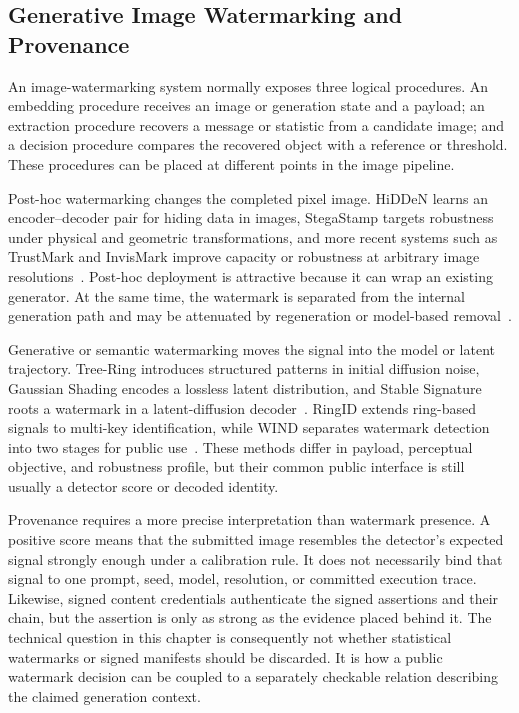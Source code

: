 \subsection{Generative Image Watermarking and Provenance}
\label{subsec:ch4-watermark-background}

An image-watermarking system normally exposes three logical procedures.  An
embedding procedure receives an image or generation state and a payload; an
extraction procedure recovers a message or statistic from a candidate image; and a
decision procedure compares the recovered object with a reference or threshold.
These procedures can be placed at different points in the image pipeline.

Post-hoc watermarking changes the completed pixel image.  HiDDeN learns an
encoder--decoder pair for hiding data in images, StegaStamp targets robustness
under physical and geometric transformations, and more recent systems such as
TrustMark and InvisMark improve capacity or robustness at arbitrary image
resolutions~\cite{zhu2018hidden,tancik2020stegastamp,bui2025trustmark,
xu2025invismark}.  Post-hoc deployment is attractive because it can wrap an
existing generator.  At the same time, the watermark is separated from the
internal generation path and may be attenuated by regeneration or model-based
removal~\cite{zhao2024removable}.

Generative or semantic watermarking moves the signal into the model or latent
trajectory.  Tree-Ring introduces structured patterns in initial diffusion noise,
Gaussian Shading encodes a lossless latent distribution, and Stable Signature
roots a watermark in a latent-diffusion decoder~\cite{wen2023treerings,
yang2024gaussianshading,fernandez2023stablesignature}.  RingID extends ring-based
signals to multi-key identification, while WIND separates watermark detection into
two stages for public use~\cite{ci2024ringid,arabi2025wind}.  These methods differ
in payload, perceptual objective, and robustness profile, but their common public
interface is still usually a detector score or decoded identity.

Provenance requires a more precise interpretation than watermark presence.  A
positive score means that the submitted image resembles the detector's expected
signal strongly enough under a calibration rule.  It does not necessarily bind
that signal to one prompt, seed, model, resolution, or committed execution trace.
Likewise, signed content credentials authenticate the signed assertions and their
chain, but the assertion is only as strong as the evidence placed behind it.  The
technical question in this chapter is consequently not whether statistical
watermarks or signed manifests should be discarded.  It is how a public
watermark decision can be coupled to a separately checkable relation describing
the claimed generation context.

